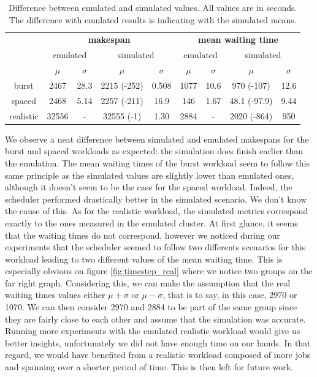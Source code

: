 \begin{table}
	\centering
	\begin{tabular}{|c|c|c|c|c|c|c|c|c|}
		\hline

		\multirow{3}{*}{} & \multicolumn{4}{c|}{\textbf{makespan}} & \multicolumn{4}{c|}{\textbf{mean waiting time}}\\

		\cline{2-9}

		& \multicolumn{2}{c|}{emulated} &
		\multicolumn{2}{c|}{simulated} & \multicolumn{2}{c|}{emulated}
		& \multicolumn{2}{c|}{simulated} \\

		\cline{2-9}

		& $\mu$ & $\sigma$ & $\mu$ & $\sigma$ & $\mu$ & $\sigma$ & $\mu$ & $\sigma$ \\
		
		\hline

		burst & 2467 & 28.3 & 2215 (-252) & 0.508 & 1077 & 10.6 & 970 (-107) & 12.6 \\
		spaced & 2468 & 5.14 & 2257 (-211) & 16.9 & 146 & 1.67 & 48.1 (-97.9) & 9.44 \\
		realistic & 32556 & - & 32555 (-1) & 1.30 & 2884 & - & 2020 (-864) & 950 \\
		\hline
	\end{tabular}
	\caption{Difference between emulated and simulated values. All values
	are in seconds. The difference with emulated results is indicating with
the simulated means.}
	\label{tab:deviation}
\end{table}

We observe a neat difference between simulated and emulated makespans for the
burst and spaced workloads as expected: the simulation does finish
earlier than the emulation. The mean waiting times of the burst workload seem
to follow this same principle as the simulated values are slightly lower than
emulated ones, although it doesn't seem to be the case for the spaced workload.
Indeed, the scheduler performed drastically better in the simulated scenario.
We don't know the cause of this. As for the realistic workload, the simulated
metrics correspond exactly to the ones measured in the emulated cluster. At
first glance, it seems that the waiting times do not correspond, however we
noticed during our experiments that the scheduler seemed to follow two
differents scenarios for this workload leading to two different values of the
mean waiting time.  This is especially obvious on figure
\ref{fig:timestep_real} where we notice two groups on the far right graph.
Considering this, we can make the assumption that the real waiting times values
either $\mu + \sigma$ or $\mu - \sigma$, that is to say, in this case, 2970 or
1070. We can then consider 2970 and 2884 to be part of the same group since
they are fairly close to each other and assume that the simulation was
accurate. Running more experiments with the emulated realistic workload would
give us better insights, unfortunately we did not have enough time on our
hands. In that regard, we would have benefited from a realistic workload
composed of more jobs and spanning over a shorter period of time. This is then
left for future work.

